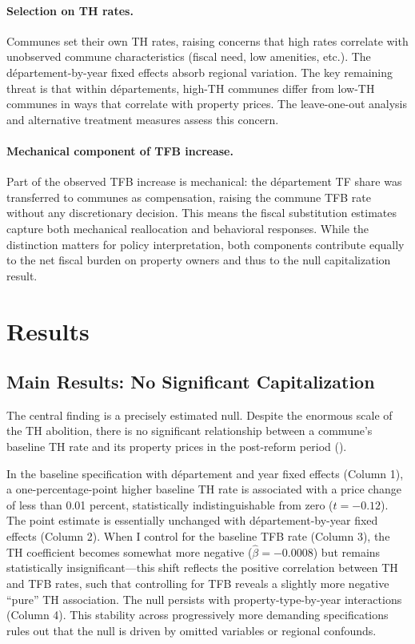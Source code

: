 \documentclass[12pt]{article}
\begin{document}
\paragraph{Selection on TH rates.} Communes set their own TH rates, raising concerns that high rates correlate with unobserved commune characteristics (fiscal need, low amenities, etc.). The d\'epartement-by-year fixed effects absorb regional variation. The key remaining threat is that within d\'epartements, high-TH communes differ from low-TH communes in ways that correlate with property prices. The leave-one-out analysis and alternative treatment measures assess this concern.

\paragraph{Mechanical component of TFB increase.} Part of the observed TFB increase is mechanical: the d\'epartement TF share was transferred to communes as compensation, raising the commune TFB rate without any discretionary decision. This means the fiscal substitution estimates capture both mechanical reallocation and behavioral responses. While the distinction matters for policy interpretation, both components contribute equally to the net fiscal burden on property owners and thus to the null capitalization result.


\section{Results}\label{sec:results}

\subsection{Main Results: No Significant Capitalization}

The central finding is a precisely estimated null. Despite the enormous scale of the TH abolition, there is no significant relationship between a commune's baseline TH rate and its property prices in the post-reform period ().

In the baseline specification with d\'epartement and year fixed effects (Column 1), a one-percentage-point higher baseline TH rate is associated with a price change of less than 0.01 percent, statistically indistinguishable from zero ($t = -0.12$). The point estimate is essentially unchanged with d\'epartement-by-year fixed effects (Column 2). When I control for the baseline TFB rate (Column 3), the TH coefficient becomes somewhat more negative ($\hat{\beta} = -0.0008$) but remains statistically insignificant---this shift reflects the positive correlation between TH and TFB rates, such that controlling for TFB reveals a slightly more negative ``pure'' TH association. The null persists with property-type-by-year interactions (Column 4). This stability across progressively more demanding specifications rules out that the null is driven by omitted variables or regional confounds.
\end{document}
